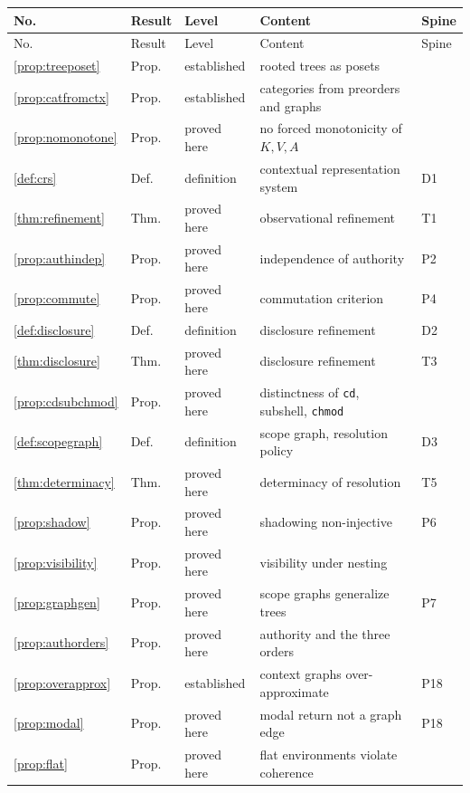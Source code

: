 \documentclass[11pt]{article}
\theoremstyle{definition}
\theoremstyle{remark}
\begin{document}
\begin{center}
\small
\begin{longtable}{lllp{5.3cm}l}
\toprule
No. & Result & Level & Content & Spine\\
\midrule
\endfirsthead
\toprule
No. & Result & Level & Content & Spine\\
\midrule
\endhead
\ref{prop:treeposet} & Prop. & established & rooted trees as posets & \\
\ref{prop:catfromctx} & Prop. & established & categories from preorders and graphs & \\
\ref{prop:nomonotone} & Prop. & proved here & no forced monotonicity of $K,V,A$ & \\
\ref{def:crs} & Def. & definition & contextual representation system & D1\\
\ref{thm:refinement} & Thm. & proved here & observational refinement & T1\\
\ref{prop:authindep} & Prop. & proved here & independence of authority & P2\\
\ref{prop:commute} & Prop. & proved here & commutation criterion & P4\\
\ref{def:disclosure} & Def. & definition & disclosure refinement & D2\\
\ref{thm:disclosure} & Thm. & proved here & disclosure refinement & T3\\
\ref{prop:cdsubchmod} & Prop. & proved here & distinctness of \texttt{cd}, subshell, \texttt{chmod} & \\
\ref{def:scopegraph} & Def. & definition & scope graph, resolution policy & D3\\
\ref{thm:determinacy} & Thm. & proved here & determinacy of resolution & T5\\
\ref{prop:shadow} & Prop. & proved here & shadowing non-injective & P6\\
\ref{prop:visibility} & Prop. & proved here & visibility under nesting & \\
\ref{prop:graphgen} & Prop. & proved here & scope graphs generalize trees & P7\\
\ref{prop:authorders} & Prop. & proved here & authority and the three orders & \\
\ref{prop:overapprox} & Prop. & established & context graphs over-approximate & P18\\
\ref{prop:modal} & Prop. & proved here & modal return not a graph edge & P18\\
\ref{prop:flat} & Prop. & proved here & flat environments violate coherence & \\

\end{longtable}
\end{center}
\end{document}

